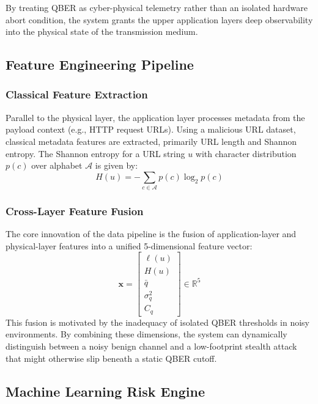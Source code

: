 \documentclass[conference]{IEEEtran}
\begin{document}
By treating QBER as cyber-physical telemetry rather than an isolated hardware abort condition, the system grants the upper application layers deep observability into the physical state of the transmission medium.

\subsection{Feature Engineering Pipeline}

\subsubsection{Classical Feature Extraction}
Parallel to the physical layer, the application layer processes metadata from the payload context (e.g., HTTP request URLs). Using a malicious URL dataset, classical metadata features are extracted, primarily URL length and Shannon entropy. 
The Shannon entropy for a URL string $u$ with character distribution $p(c)$ over alphabet $\mathcal{A}$ is given by:
\begin{equation}
H(u) = -\sum_{c \in \mathcal{A}} p(c) \log_2 p(c)
\end{equation}

\subsubsection{Cross-Layer Feature Fusion}
The core innovation of the data pipeline is the fusion of application-layer and physical-layer features into a unified 5-dimensional feature vector:
\begin{equation}
\mathbf{x} = \begin{bmatrix} \ell(u) \\ H(u) \\ \bar{q} \\ \sigma_q^2 \\ C_q \end{bmatrix} \in \mathbb{R}^5
\end{equation}
This fusion is motivated by the inadequacy of isolated QBER thresholds in noisy environments. By combining these dimensions, the system can dynamically distinguish between a noisy benign channel and a low-footprint stealth attack that might otherwise slip beneath a static QBER cutoff.

\subsection{Machine Learning Risk Engine}
\end{document}
